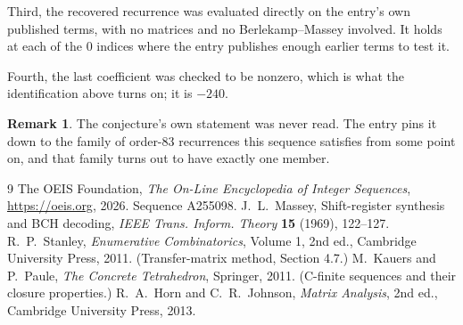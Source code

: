\documentclass[11pt,a4paper]{article}
\theoremstyle{plain}
\theoremstyle{definition}
\newtheorem{remark}[theorem]{Remark}
\begin{document}
Third, the recovered recurrence was evaluated directly on the entry's own published terms, with
no matrices and no Berlekamp--Massey involved. It holds at each of the $0$ indices where
the entry publishes enough earlier terms to test it.

Fourth, the last coefficient was checked to be nonzero, which is what the identification above
turns on; it is $-240$.

\begin{remark}
The conjecture's own statement was never read. The entry pins it down to the family of
order-$83$ recurrences this sequence satisfies from some point on, and that family turns
out to have exactly one member.
\end{remark}

\begin{thebibliography}{9}
 The OEIS Foundation, \emph{The On-Line Encyclopedia of Integer
Sequences}, \url{https://oeis.org}, 2026. Sequence A255098.
 J.~L.~Massey, Shift-register synthesis and BCH decoding, \emph{IEEE
Trans. Inform. Theory} \textbf{15} (1969), 122--127.
 R.~P.~Stanley, \emph{Enumerative Combinatorics}, Volume 1, 2nd ed.,
Cambridge University Press, 2011. (Transfer-matrix method, Section 4.7.)
 M.~Kauers and P.~Paule, \emph{The Concrete Tetrahedron}, Springer, 2011.
(C-finite sequences and their closure properties.)
 R.~A.~Horn and C.~R.~Johnson, \emph{Matrix Analysis}, 2nd ed., Cambridge
University Press, 2013.
\end{thebibliography}
\end{document}
